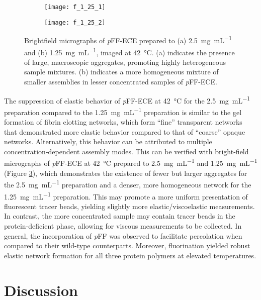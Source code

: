 \begin{refsection}
\label{sec:ECE_explanation}
\begin{figure}
    \centering
    \begin{subfigure}[b]{0.47\textwidth}
        \texttt{[image: f\_1\_25\_1]}
        \caption{}
        \label{fig:brightfield_ECE_2.5}
    \end{subfigure}
    \begin{subfigure}[b]{0.47\textwidth}
        \texttt{[image: f\_1\_25\_2]}
        \caption{}
        \label{fig:brightfield_ECE_1.25}
    \end{subfigure}
    \caption{Brightfield micrographs of \emph{p}FF-ECE prepared to
    (a) \SI{2.5}{\mg\per\mL} and (b) \SI{1.25}{\mg\per\mL}, imaged at
    \SI{42}{\celsius}. (a) indicates the presence of large, macroscopic
    aggregates, promoting highly heterogeneous sample mixtures. (b) indicates a
    more homogeneous mixture of smaller assemblies in lesser concentrated
    samples of \emph{p}FF-ECE.}
    \label{fig:brightfield_ECE}
\end{figure}
The suppression of elastic behavior of \emph{p}FF-ECE at \SI{42}{\celsius} for the
\SI{2.5}{\mg\per\mL} preparation compared to the \SI{1.25}{\mg\per\mL}
preparation is similar to the gel formation of fibrin clotting networks, which
form ``fine'' transparent networks that demonstrated more elastic behavior
compared to that of ``coarse'' opaque networks.\cite{Clark1987} Alternatively,
this behavior can be attributed to multiple concentration-dependent assembly
modes. This can be verified with bright-field micrographs of \emph{p}FF-ECE at
\SI{42}{\celsius} prepared to \SI{2.5}{\mg\per\mL} and \SI{1.25}{\mg\per\mL}
(Figure \ref{fig:brightfield_ECE}), which demonstrates the existence of fewer
but larger aggregates for the \SI{2.5}{\mg\per\mL} preparation and a denser,
more homogeneous network for the \SI{1.25}{\mg\per\mL} preparation. This may
promote a more uniform presentation of fluorescent tracer beads, yielding
slightly more elastic/viscoelastic measurements. In contrast, the more
concentrated sample may contain tracer beads in the protein-deficient phase,
allowing for viscous measurements to be collected. In general, the incorporation
of \emph{p}FF was observed to facilitate percolation when compared to their
wild-type counterparts. Moreover, fluorination yielded robust elastic network
formation for all three protein polymers at elevated temperatures. 

\section{Discussion}


\end{refsection}
